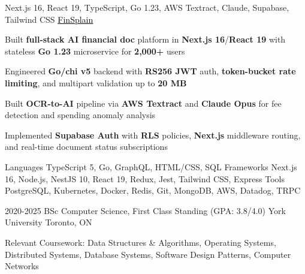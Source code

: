 \documentclass[11pt, a4paper]{awesome-cv}
\begin{document}
\begin{cventries}
\end{cventries}


\begin{cventries}

  \cventry
  {Next.js 16, React 19, TypeScript, Go 1.23, AWS Textract, Claude, Supabase, Tailwind CSS}
  {\href{https://finsplain.net}{\textcolor{black}{\underline{FinSplain}} \faExternalLink}}
  {}
  {}
  {
    \begin{cvitems}
      \item {Built \textbf{full-stack AI financial doc} platform in \textbf{Next.js 16}/\textbf{React 19} with stateless \textbf{Go 1.23} microservice for \textbf{2,000+} users}
      \item {Engineered \textbf{Go/chi v5} backend with \textbf{RS256 JWT} auth, \textbf{token-bucket rate limiting}, and multipart validation up to \textbf{20 MB}}
      \item {Built \textbf{OCR-to-AI} pipeline via \textbf{AWS Textract} and \textbf{Claude Opus} for fee detection and spending anomaly analysis}
      \item {Implemented \textbf{Supabase Auth} with \textbf{RLS} policies, \textbf{Next.js} middleware routing, and real-time document status subscriptions}
    \end{cvitems}
  }

\end{cventries}


\begin{cvskills}
  \cvskill
  {Languages}
  {TypeScript 5, Go, GraphQL, HTML/CSS, SQL}
  \cvskill
  {Frameworks}
  {Next.js 16, Node.js, NestJS 10, React 19, Redux, Jest, Tailwind CSS, Express}
  \cvskill
  {Tools}
  {PostgreSQL, Kubernetes, Docker, Redis, Git, MongoDB, AWS, Datadog, TRPC}
\end{cvskills}

\vspace{-2mm}

\begin{cventries}
  \cventry
  {2020-2025}
  {BSc Computer Science, First Class Standing (GPA: 3.8/4.0)}
  {York University}
  {Toronto, ON}
  {%
    \begin{cvitems}
      \item {Relevant Coursework: Data Structures \& Algorithms, Operating Systems, Distributed Systems, Database Systems, Software Design Patterns, Computer Networks}
    \end{cvitems}
  }
\end{cventries}

\end{document}
